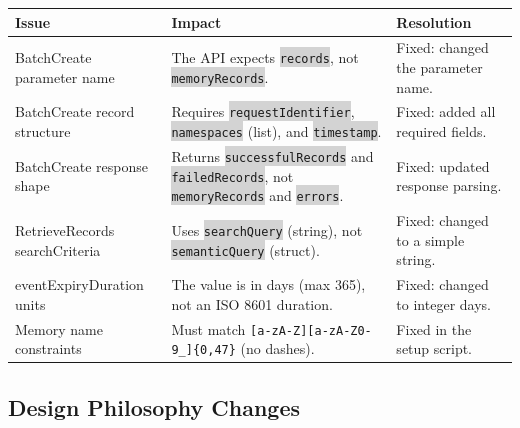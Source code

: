 \documentclass[11pt,letterpaper]{article}
\renewcommand{\arraystretch}{1.4}
\newcommand{\code}[1]{\texttt{\small\colorbox{lightgray}{#1}}}
\begin{document}
\begin{center}
\small
\renewcommand{\arraystretch}{1.35}
\begin{tabularx}{\textwidth}{>{\raggedright\arraybackslash}p{3.2cm} Y Y}
\textbf{\color{successgreen}Issue} & \textbf{\color{successgreen}Impact} & \textbf{\color{successgreen}Resolution} \\
\midrule
{}
BatchCreate parameter name & The API expects \code{records}, not \code{memoryRecords}. & Fixed: changed the parameter name. \\
BatchCreate record structure & Requires \code{requestIdentifier}, \code{namespaces} (list), and \code{timestamp}. & Fixed: added all required fields. \\
BatchCreate response shape & Returns \code{successfulRecords} and \code{failedRecords}, not \code{memoryRecords} and \code{errors}. & Fixed: updated response parsing. \\
RetrieveRecords searchCriteria & Uses \code{searchQuery} (string), not \code{semanticQuery} (struct). & Fixed: changed to a simple string. \\
eventExpiryDuration units & The value is in days (max 365), not an ISO 8601 duration. & Fixed: changed to integer days. \\
Memory name constraints & Must match \texttt{[a-zA-Z][a-zA-Z0-9\_]\{0,47\}} (no dashes). & Fixed in the setup script. \\
\bottomrule
\end{tabularx}
\end{center}

\subsection*{Design Philosophy Changes}
\end{document}
